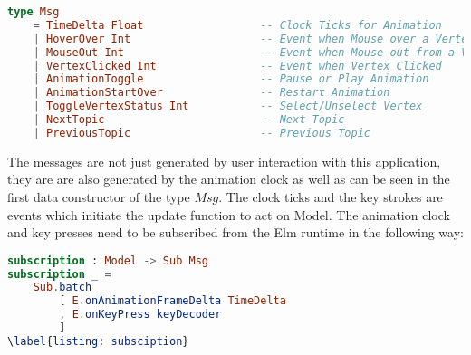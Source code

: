 \begin{lstlisting}[language=elm
                  , caption={
                              Abstract Data Type Msg with it's Data Constructors.
                              These messages are emanated from buttons, graph vertices
                              system clocks and are received by the update function
                              to change the $Model$, which carries the state of the
                              program.
                  }
                  ]
type Msg
    = TimeDelta Float                  -- Clock Ticks for Animation
    | HoverOver Int                    -- Event when Mouse over a Vertex                              
    | MouseOut Int                     -- Event when Mouse out from a Vertex                               
    | VertexClicked Int                -- Event when Vertex Clicked                              
    | AnimationToggle                  -- Pause or Play Animation
    | AnimationStartOver               -- Restart Animation
    | ToggleVertexStatus Int           -- Select/Unselect Vertex
    | NextTopic                        -- Next Topic
    | PreviousTopic                    -- Previous Topic
\end{lstlisting}
The messages are not just generated by user interaction with this application,
they are are also generated by the animation clock as well as can be seen in
the first data constructor of the type $Msg$.
The clock ticks and the key strokes are events which initiate the update function to act on Model.
The animation clock and key presses need to be subscribed from the Elm runtime in the following way:

\begin{lstlisting}[language=elm
                  , caption={
                            Subscription of Animation clock and Key presses services.
                            Subscriptions are used to catch the events which are
                            emanated outside the DOM. In this code, a system clock
                            and key presses are subscribed to by the program.
                            }
                  ]
subscription : Model -> Sub Msg
subscription _ =
    Sub.batch
        [ E.onAnimationFrameDelta TimeDelta
        , E.onKeyPress keyDecoder
        ]
\label{listing: subsciption}
\end{lstlisting}

